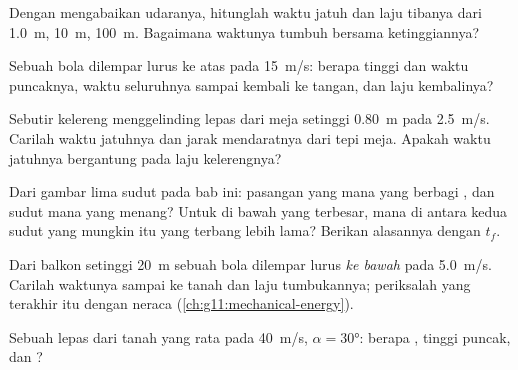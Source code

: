 \begin{exercise}[$\star$]\label{exo:g12:projectile-motion:3}
Dengan mengabaikan udaranya, hitunglah waktu jatuh dan laju tibanya dari
\qty{1.0}{m}, \qty{10}{m}, \qty{100}{m}. Bagaimana waktunya tumbuh bersama ketinggiannya?
\end{exercise}

\begin{exercise}[$\star$]\label{exo:g12:projectile-motion:4}
Sebuah bola dilempar lurus ke atas pada \qty{15}{m/s}: berapa tinggi dan
waktu puncaknya, waktu seluruhnya sampai kembali ke tangan, dan laju kembalinya?
\end{exercise}

\begin{exercise}[$\star$]\label{exo:g12:projectile-motion:5}
Sebutir kelereng menggelinding lepas dari meja setinggi \qty{0.80}{m} pada
\qty{2.5}{m/s}. Carilah waktu jatuhnya dan jarak mendaratnya dari tepi meja.
Apakah waktu jatuhnya bergantung pada laju kelerengnya?
\end{exercise}

\begin{exercise}[$\star\star$]\label{exo:g12:projectile-motion:6}
Dari gambar lima sudut pada bab ini: pasangan  yang mana yang
berbagi , dan sudut mana yang menang? Untuk  di bawah
yang terbesar, mana di antara kedua sudut yang mungkin itu yang terbang
lebih lama? Berikan alasannya dengan $t_f$.
\end{exercise}

\begin{exercise}[$\star\star$]\label{exo:g12:projectile-motion:7}
Dari balkon setinggi \qty{20}{m} sebuah bola dilempar lurus \emph{ke bawah}
pada \qty{5.0}{m/s}. Carilah waktunya sampai ke tanah dan laju tumbukannya;
periksalah yang terakhir itu dengan neraca  (\cref{ch:g11:mechanical-energy}).
\end{exercise}

\begin{exercise}[$\star\star$]\label{exo:g12:projectile-motion:8}
Sebuah  lepas dari tanah yang rata pada \qty{40}{m/s},
$\alpha = \ang{30}$: berapa , tinggi puncak, dan ?
\end{exercise}

